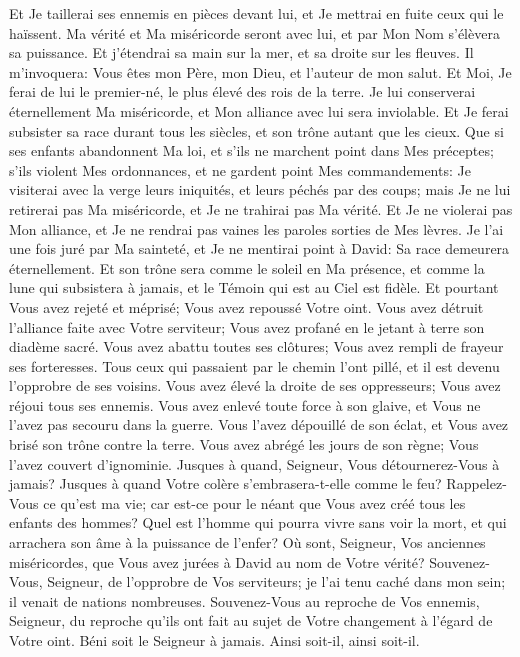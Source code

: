 {\VERSE Et Je taillerai ses ennemis en pièces devant lui, et Je mettrai en fuite ceux qui le haïssent. \EVERSE
\VERSE Ma vérité et Ma miséricorde seront avec lui, et par Mon Nom s'élèvera sa puissance. \EVERSE
\VERSE Et j'étendrai sa main sur la mer, et sa droite sur les fleuves. \EVERSE
\VERSE Il m'invoquera: Vous êtes mon Père, mon Dieu, et l'auteur de mon salut. \EVERSE
\VERSE Et Moi, Je ferai de lui le premier-né, le plus élevé des rois de la terre. \EVERSE
\VERSE Je lui conserverai éternellement Ma miséricorde, et Mon alliance avec lui sera inviolable. \EVERSE
\VERSE Et Je ferai subsister sa race durant tous les siècles, et son trône autant que les cieux. \EVERSE
\VERSE Que si ses enfants abandonnent Ma loi, et s'ils ne marchent point dans Mes préceptes; \EVERSE
\VERSE s'ils violent Mes ordonnances, et ne gardent point Mes commandements: \EVERSE
\VERSE Je visiterai avec la verge leurs iniquités, et leurs péchés par des coups; \EVERSE
\VERSE mais Je ne lui retirerai pas Ma miséricorde, et Je ne trahirai pas Ma vérité. \EVERSE
\VERSE Et Je ne violerai pas Mon alliance, et Je ne rendrai pas vaines les paroles sorties de Mes lèvres. \EVERSE
\VERSE Je l'ai une fois juré par Ma sainteté, et Je ne mentirai point à David:  \EVERSE
\VERSE Sa race demeurera éternellement. \EVERSE
\VERSE Et son trône sera comme le soleil en Ma présence, et comme la lune qui subsistera à jamais, et le Témoin qui est au Ciel est fidèle. \EVERSE
\VERSE Et pourtant Vous avez rejeté et méprisé; Vous avez repoussé Votre oint. \EVERSE
\VERSE Vous avez détruit l'alliance faite avec Votre serviteur; Vous avez profané en le jetant à terre son diadème sacré. \EVERSE
\VERSE Vous avez abattu toutes ses clôtures; Vous avez rempli de frayeur ses forteresses. \EVERSE
\VERSE Tous ceux qui passaient par le chemin l'ont pillé, et il est devenu l'opprobre de ses voisins. \EVERSE
\VERSE Vous avez élevé la droite de ses oppresseurs; Vous avez réjoui tous ses ennemis. \EVERSE
\VERSE Vous avez enlevé toute force à son glaive, et Vous ne l'avez pas secouru dans la guerre. \EVERSE
\VERSE Vous l'avez dépouillé de son éclat, et Vous avez brisé son trône contre la terre. \EVERSE
\VERSE Vous avez abrégé les jours de son règne; Vous l'avez couvert d'ignominie. \EVERSE
\VERSE Jusques à quand, Seigneur, Vous détournerez-Vous à jamais? Jusques à quand Votre colère s'embrasera-t-elle comme le feu? \EVERSE
\VERSE Rappelez-Vous ce qu'est ma vie; car est-ce pour le néant que Vous avez créé tous les enfants des hommes? \EVERSE
\VERSE Quel est l'homme qui pourra vivre sans voir la mort, et qui arrachera son âme à la puissance de l'enfer? \EVERSE
\VERSE Où sont, Seigneur, Vos anciennes miséricordes, que Vous avez jurées à David au nom de Votre vérité? \EVERSE
\VERSE Souvenez-Vous, Seigneur, de l'opprobre de Vos serviteurs; je l'ai tenu caché dans mon sein; il venait de nations nombreuses. \EVERSE
\VERSE Souvenez-Vous au reproche de Vos ennemis, Seigneur, du reproche qu'ils ont fait au sujet de Votre changement à l'égard de Votre oint. \EVERSE
\VERSE Béni soit le Seigneur à jamais. Ainsi soit-il, ainsi soit-il.

}
